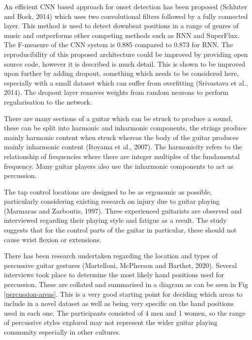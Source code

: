 \documentclass[conference]{IEEEtran}
\begin{document}
An efficient CNN based approach for onset detection has been proposed (Schluter and Bock, 2014) which uses two convolutional filters followed by a fully connected layer. This method is used to detect
downbeat positions in a range of genres of music and outperforms other competing methods such as RNN and SuperFlux. The F-measure of the CNN system is 0.885 compared to 0.873 for RNN. The reproducibility of 
this proposed architecture could be improved by providing open source code, however it is described is much detail. This
is shown to be improved upon further by adding dropout, something which needs to be considered here, especially with a small dataset which can suffer from overfitting (Srivastava et al., 2014). The dropout layer
removes weights from random neurons to perform regularisation to the network.

There are many sections of a guitar which can be struck to produce a sound, these can be split into harmonic and inharmonic components, the strings produce mainly harmonic content when
struck whereas the body of the guitar produces mainly inharmonic content (Itoyama et al., 2007). The harmonicity refers to the relationship of frequencies where there are integer multiples of the fundamental frequency.
Many guitar players also use the inharmonic components to act as percussion. 

The tap control locations are designed to be as ergonomic as possible, particularly considering existing research on injury due to guitar playing (Marmaras and Zarboutis, 1997). Three experienced guitarists are observed and interviewed regarding their playing
style and fatigue as a result. The study suggests that for the control parts of the guitar in particular, these should not cause wrist flexion or extensions. 

There has been research undertaken regarding the location and types of percussive guitar gestures (Martelloni, McPherson and Barthet, 2020). Several interviews took place to determine the most likely hand positions used for percussion. These
are collated and summarised in a diagram as can be seen in Fig \ref{percussion-areas}. This is a very good starting point for deciding which areas to include in a novel dataset as well as being very specific on the hand positions used in each one.
The participants consisted of 4 men and 1 women, so the range of percussive styles explored may not represent the wider guitar playing community especially in other cultures. 
\end{document}
